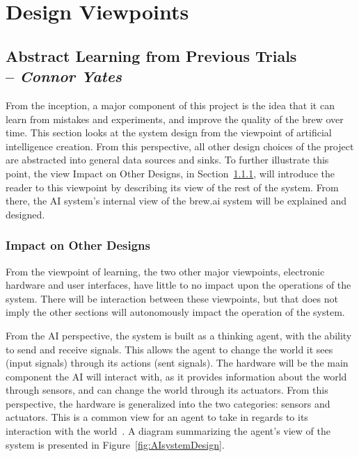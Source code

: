 \documentclass[draftclsnofoot,onecolumn,letterpaper,10pt]{IEEEtran}
\begin{document}
\section{Design Viewpoints}

\subsection{Abstract Learning from Previous Trials \\ -- \textbf{\textit{Connor Yates}}}\label{sec:learning}
From the inception, a major component of this project is the idea that it can learn from mistakes and experiments, and improve the quality of the brew over time.
This section looks at the system design from the viewpoint of artificial intelligence creation.
From this perspective, all other design choices of the project are abstracted into general data sources and sinks.
To further illustrate this point, the view Impact on Other Designs, in Section~\ref{sec:AIImpact}, will introduce the reader to this viewpoint by describing its view of the rest of the system.
From there, the AI system's internal view of the brew.ai system will be explained and designed.

\subsubsection{Impact on Other Designs}\label{sec:AIImpact}
From the viewpoint of learning, the two other major viewpoints, electronic hardware and user interfaces, have little to no impact upon the operations of the system.
There will be interaction between these viewpoints, but that does not imply the other sections will autonomously impact the operation of the system.

From the AI perspective, the system is built as a thinking agent, with the ability to send and receive signals.
This allows the agent to change the world it sees (input signals) through its actions (sent signals).
The hardware will be the main component the AI will interact with, as it provides information about the world through sensors, and can change the world through its actuators.
From this perspective, the hardware is generalized into the two categories: sensors and actuators.
This is a common view for an agent to take in regards to its interaction with the world~\cite{RussellNorvig}.
A diagram summarizing the agent's view of the system is presented in Figure~\ref{fig:AIsystemDesign}.
\end{document}
